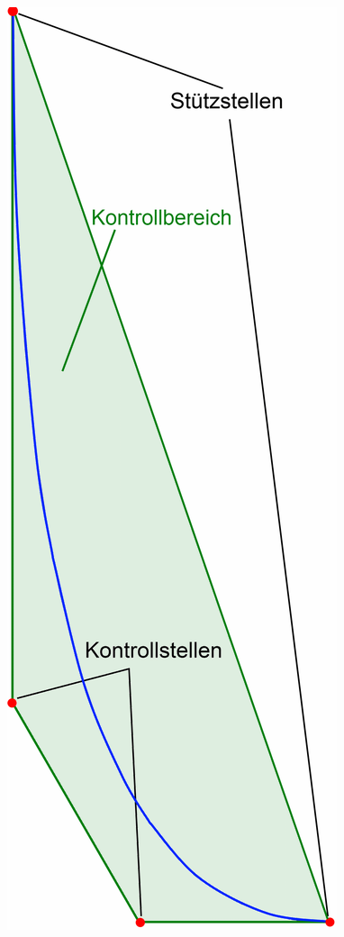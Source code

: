 \begin{minipage}[c]{4cm}
  	\includegraphics[width=\textwidth]{bilder/bernsteinBezier}
\end{minipage}

